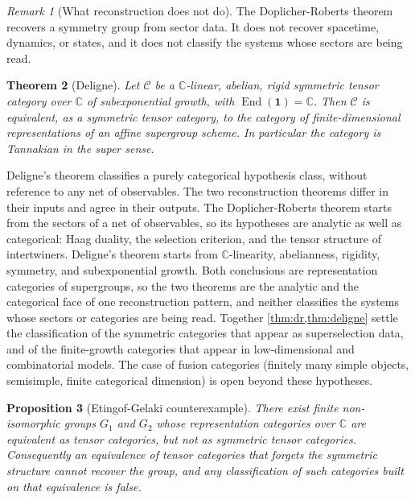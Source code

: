 \documentclass[11pt,letterpaper]{article}
\newtheorem{theorem}{Theorem}[section]
\newtheorem{proposition}[theorem]{Proposition}
\theoremstyle{definition}
\theoremstyle{remark}
\newtheorem{remark}[theorem]{Remark}
\begin{document}
\begin{remark}[What reconstruction does not do]
\label{rem:scope}
The Doplicher-Roberts theorem recovers a symmetry group from sector data. It does not recover spacetime, dynamics, or states, and it does not classify the systems whose sectors are being read.
\end{remark}

\begin{theorem}[Deligne]
\label{thm:deligne}
Let $\mathcal{C}$ be a $\mathbb{C}$-linear, abelian, rigid symmetric tensor category over $\mathbb{C}$ of subexponential growth, with $\operatorname{End}(\mathbf{1}) = \mathbb{C}$. Then $\mathcal{C}$ is equivalent, as a symmetric tensor category, to the category of finite-dimensional representations of an affine supergroup scheme. In particular the category is Tannakian in the super sense.
\end{theorem}

Deligne's theorem classifies a purely categorical hypothesis class, without reference to any net of observables. The two reconstruction theorems differ in their inputs and agree in their outputs. The Doplicher-Roberts theorem starts from the sectors of a net of observables, so its hypotheses are analytic as well as categorical: Haag duality, the selection criterion, and the tensor structure of intertwiners. Deligne's theorem starts from $\mathbb{C}$-linearity, abelianness, rigidity, symmetry, and subexponential growth. Both conclusions are representation categories of supergroups, so the two theorems are the analytic and the categorical face of one reconstruction pattern, and neither classifies the systems whose sectors or categories are being read. Together \cref{thm:dr,thm:deligne} settle the classification of the symmetric categories that appear as superselection data, and of the finite-growth categories that appear in low-dimensional and combinatorial models. The case of fusion categories (finitely many simple objects, semisimple, finite categorical dimension) is open beyond these hypotheses.

\begin{proposition}[Etingof-Gelaki counterexample]
\label{prop:eg}
There exist finite non-isomorphic groups $G_1$ and $G_2$ whose representation categories over $\mathbb{C}$ are equivalent as tensor categories, but not as symmetric tensor categories. Consequently an equivalence of tensor categories that forgets the symmetric structure cannot recover the group, and any classification of such categories built on that equivalence is false.
\end{proposition}
\end{document}
